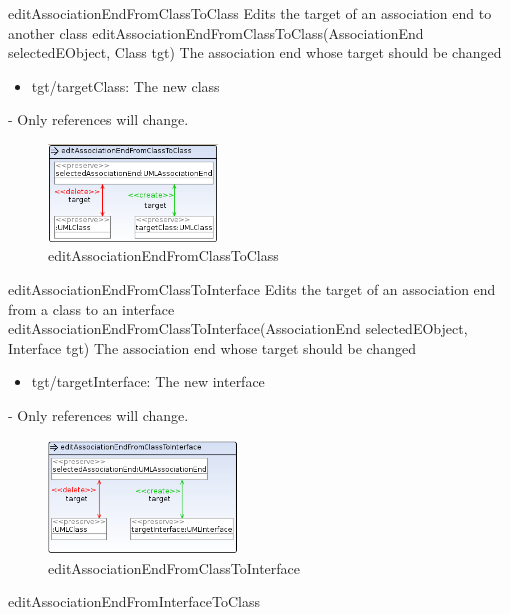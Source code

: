 \op
{editAssociationEndFromClassToClass}
{Edits the target of an association end to another class}
{editAssociationEndFromClassToClass(AssociationEnd selectedEObject, Class
tgt)}
{The association end whose target should be changed}
{
\begin{itemize}
 \item tgt/targetClass: The new class
\end{itemize}
}
{-}
{Only references will change.}
\begin{figure}[H]
  \centering
  \includegraphics[width=0.4\textwidth]{pics/editAssociationEndFromClassToClass.png}
  \caption{editAssociationEndFromClassToClass}
  \label{editAssociationEndFromClassToClass}
\end{figure}
\op
{editAssociationEndFromClassToInterface}
{Edits the target of an association end from a class to an interface}
{editAssociationEndFromClassToInterface(AssociationEnd selectedEObject,
Interface tgt)}
{The association end whose target should be changed}
{
\begin{itemize}
 \item tgt/targetInterface: The new interface
\end{itemize}
}
{-}
{Only references will change.}
\begin{figure}[H]
  \centering
  \includegraphics[width=0.45\textwidth]{pics/editAssociationEndFromClassToInterface.png}
  \caption{editAssociationEndFromClassToInterface}
  \label{editAssociationEndFromClassToInterface}
\end{figure}
\op
{editAssociationEndFromInterfaceToClass}

